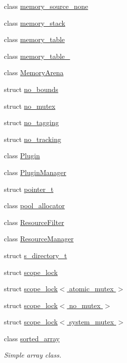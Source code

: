 \begin{DoxyCompactItemize}
\item 
class \hyperlink{classcrap_1_1memory__source__none}{memory\+\_\+source\+\_\+none}
\item 
class \hyperlink{classcrap_1_1memory__stack}{memory\+\_\+stack}
\item 
class \hyperlink{classcrap_1_1memory__table}{memory\+\_\+table}
\item 
class \hyperlink{classcrap_1_1memory__table__64}{memory\+\_\+table\+\_}
\item 
class \hyperlink{classcrap_1_1_memory_arena}{Memory\+Arena}
\item 
struct \hyperlink{structcrap_1_1no__bounds}{no\+\_\+bounds}
\item 
struct \hyperlink{structcrap_1_1no__mutex}{no\+\_\+mutex}
\item 
struct \hyperlink{structcrap_1_1no__tagging}{no\+\_\+tagging}
\item 
struct \hyperlink{structcrap_1_1no__tracking}{no\+\_\+tracking}
\item 
class \hyperlink{classcrap_1_1_plugin}{Plugin}
\item 
class \hyperlink{classcrap_1_1_plugin_manager}{Plugin\+Manager}
\item 
struct \hyperlink{structcrap_1_1pointer__t}{pointer\+\_\+t}
\item 
class \hyperlink{classcrap_1_1pool__allocator}{pool\+\_\+allocator}
\item 
class \hyperlink{classcrap_1_1_resource_filter}{Resource\+Filter}
\item 
class \hyperlink{classcrap_1_1_resource_manager}{Resource\+Manager}
\item 
struct \hyperlink{structcrap_1_1s__directory__t}{s\+\_\+directory\+\_\+t}
\item 
struct \hyperlink{structcrap_1_1scope__lock}{scope\+\_\+lock}
\item 
struct \hyperlink{structcrap_1_1scope__lock_3_01atomic__mutex_01_4}{scope\+\_\+lock$<$ atomic\+\_\+mutex $>$}
\item 
struct \hyperlink{structcrap_1_1scope__lock_3_01no__mutex_01_4}{scope\+\_\+lock$<$ no\+\_\+mutex $>$}
\item 
struct \hyperlink{structcrap_1_1scope__lock_3_01system__mutex_01_4}{scope\+\_\+lock$<$ system\+\_\+mutex $>$}
\item 
class \hyperlink{classcrap_1_1sorted__array}{sorted\+\_\+array}
\begin{DoxyCompactList}\small\item\em Simple array class. \end{DoxyCompactList}\item 

\end{DoxyCompactItemize}
